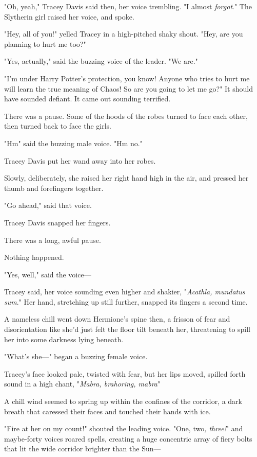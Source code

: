 "Oh, yeah," Tracey Davis said then, her voice trembling. "I almost
\emph{forgot}." The Slytherin girl raised her voice, and spoke.

"Hey, all of you!" yelled Tracey in a high-pitched shaky shout. "Hey, are you
planning to hurt me too?"

"Yes, actually," said the buzzing voice of the leader. "We are."

"I'm under Harry Potter's protection, you know! Anyone who tries to hurt me
will learn the true meaning of Chaos! So are you going to let me go?" It should
have sounded defiant. It came out sounding terrified.

There was a pause. Some of the hoods of the robes turned to face each other,
then turned back to face the girls.

"Hm{\el}" said the buzzing male voice. "Hm{\el} no."

Tracey Davis put her wand away into her robes.

Slowly, deliberately, she raised her right hand high in the air, and pressed
her thumb and forefingers together.

"Go ahead," said that voice.

Tracey Davis snapped her fingers.

There was a long, awful pause.

Nothing happened.

"Yes, well," said the voice---

Tracey said, her voice sounding even higher and shakier, "\emph{Acathla,
mundatus sum}." Her hand, stretching up still further, snapped its fingers a
second time.

A nameless chill went down Hermione's spine then, a frisson of fear and
disorientation like she'd just felt the floor tilt beneath her, threatening to
spill her into some darkness lying beneath.

"What's she\mbox{---}" began a buzzing female voice.

Tracey's face looked pale, twisted with fear, but her lips moved, spilled forth
sound in a high chant, "\emph{Mabra, brahoring, mabra{\el}}"

A chill wind seemed to spring up within the confines of the corridor, a dark
breath that caressed their faces and touched their hands with ice.

"Fire at her on my count!" shouted the leading voice. "One, two\emph{, three!}"
and maybe-forty voices roared spells, creating a huge concentric array of fiery
bolts that lit the wide corridor brighter than the Sun---

